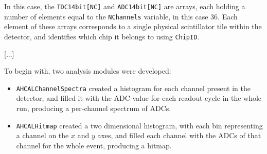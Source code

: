%
%

In this case, the \texttt{TDC14bit[NC]} and \texttt{ADC14bit[NC]} are arrays, each holding a number of elements equal to the \texttt{NChannels} variable, in this case 36. Each element of these arrays corresponds to a single physical scintillator tile within the detector, and identifies which chip it belongs to using \texttt{ChipID}. 

[...]

To begin with, two analysis modules were developed: 

\begin{itemize}
	\item \texttt{AHCALChannelSpectra} created a histogram for each channel present in the detector, and filled it with the ADC value for each readout cycle in the whole run, producing a per-channel spectrum of ADCs.
	\item \texttt{AHCALHitmap} created a two dimensional histogram, with each bin representing a channel on the $x$ and $y$ axes, and filled each channel with the ADCs of that channel for the whole event, producing a hitmap. 
\end{itemize}

